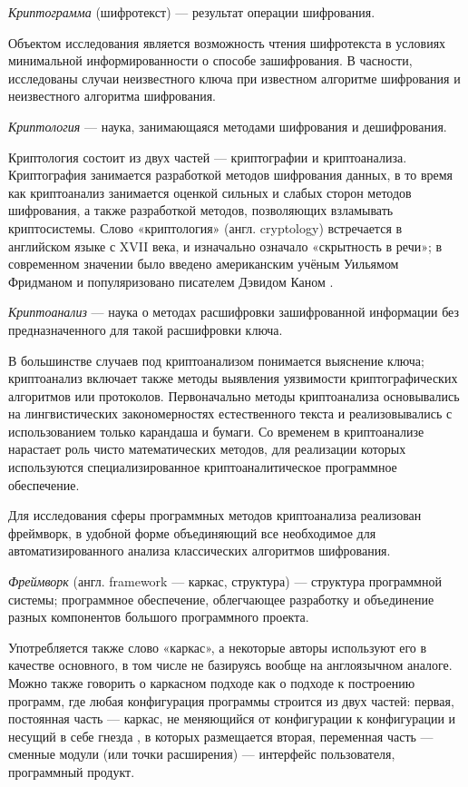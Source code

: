 \DEF\textit{Криптограмма} (шифротекст) --- результат операции шифрования.

Объектом исследования является возможность чтения шифротекста
в условиях минимальной информированности о способе 
зашифрования. В часности, исследованы случаи неизвестного 
ключа при известном алгоритме шифрования и неизвестного 
алгоритма шифрования.

\DEF\textit{Криптология} --- наука, занимающаяся методами шифрования и 
дешифрования. 

Криптология состоит из двух частей --- криптографии и криптоанализа. 
Криптография 
занимается разработкой методов шифрования данных, в то время как 
криптоанализ занимается оценкой сильных и слабых сторон методов 
шифрования, а также разработкой методов, позволяющих взламывать 
криптосистемы. Слово «криптология» (англ. cryptology) встречается в 
английском языке с XVII века, и изначально означало «скрытность в речи»; 
в современном значении было введено американским учёным Уильямом Фридманом 
и популяризовано писателем Дэвидом Каном \cite{khan-codebreakers}.

\DEF\textit{Криптоанализ} --- 
наука о методах расшифровки зашифрованной информации без предназначенного 
для такой расшифровки ключа.

В большинстве случаев под криптоанализом понимается выяснение ключа; 
криптоанализ включает также методы выявления уязвимости криптографических 
алгоритмов или протоколов. Первоначально методы криптоанализа основывались 
на лингвистических закономерностях естественного текста и реализовывались 
с использованием только карандаша и бумаги. Со временем в криптоанализе 
нарастает роль чисто математических методов, для реализации которых 
используются специализированное криптоаналитическое программное 
обеспечение.

Для исследования сферы программных методов криптоанализа 
реализован фреймворк, в удобной форме объединяющий все 
необходимое для автоматизированного анализа классических 
алгоритмов шифрования.

\DEF\textit{Фреймворк} (англ. framework --- каркас, структура) ---
структура программной 
системы; программное обеспечение, облегчающее разработку и объединение 
разных компонентов большого программного проекта. 

Употребляется 
также слово «каркас», а некоторые авторы используют его в качестве 
основного, в том числе не базируясь вообще на англоязычном аналоге.
Можно также говорить о каркасном подходе как о 
подходе к построению программ, где любая конфигурация программы 
строится из двух частей: первая, постоянная часть — каркас, не 
меняющийся от конфигурации к конфигурации и несущий в себе гнезда
, в которых размещается вторая, переменная часть — сменные модули 
(или точки расширения) --- интерфейс пользователя, программный 
продукт.

